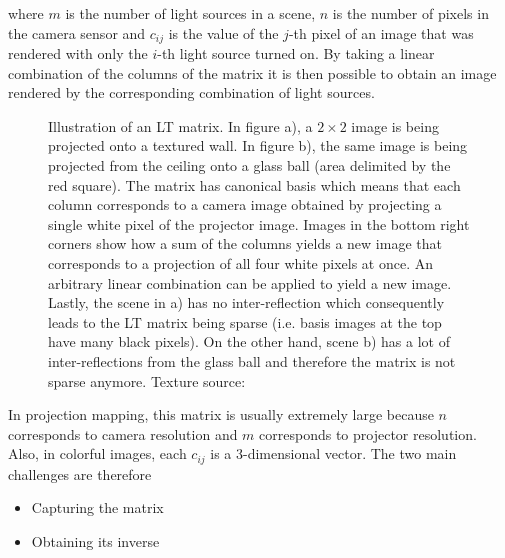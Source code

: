 where \(m\) is the number of light sources in a scene, \(n\) is the number of pixels in the camera sensor and \(c_{ij}\) is the value of the \(j\)-th pixel of an image that was rendered with only the \(i\)-th light source turned on. By taking a linear combination of the columns of the matrix it is then possible to obtain an image rendered by the corresponding combination of light sources.

\begin{figure}[]
    \centering
    \begin{subfigure}[b]{\textwidth}
        \centering
        \def\svgwidth{\textwidth}
        
        \caption{}
    \end{subfigure}
    
    \begin{subfigure}[b]{\textwidth}
        \centering
        \def\svgwidth{\textwidth}
        
        \caption{}
    \end{subfigure}
    \caption{Illustration of an LT matrix. In figure a), a \(2 \times 2\) image is being projected onto a textured wall. In figure b), the same image is being projected from the ceiling onto a glass ball (area delimited by the red square). The matrix has canonical basis which means that each column corresponds to a camera image obtained by projecting a single white pixel of the projector image. Images in the bottom right corners show how a sum of the columns yields a new image that corresponds to a projection of all four white pixels at once. An arbitrary linear combination can be applied to yield a new image. Lastly, the scene in a) has no inter-reflection which consequently leads to the LT matrix being sparse (i.e. basis images at the top have many black pixels). On the other hand, scene b) has a lot of inter-reflections from the glass ball and therefore the matrix is not sparse anymore. Texture source: \citet{Pixar128}}
    \label{fig:background_lt_capture}
\end{figure}

In projection mapping, this matrix is usually extremely large because \(n\) corresponds to camera resolution and \(m\) corresponds to projector resolution. Also, in colorful images, each \(c_{ij}\) is a 3-dimensional vector. The two main challenges are therefore

\begin{itemize}
    \item Capturing the matrix
    \item Obtaining its inverse
\end{itemize}

